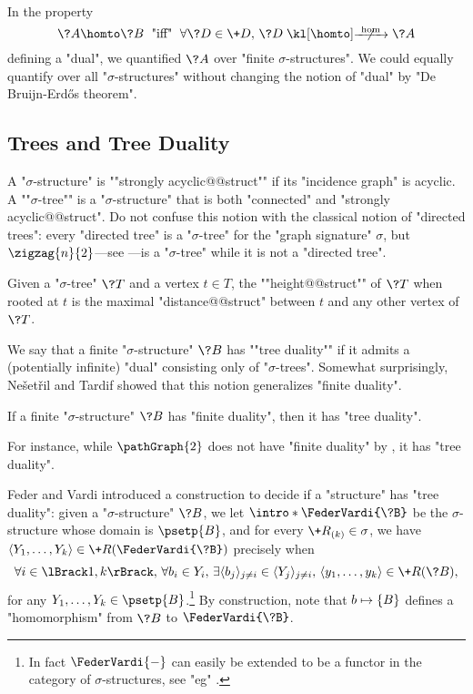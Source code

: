 \begin{remark}
	In the property
	\[
		\?A \homto \?B
		\;\text{ "iff" }\;
		\forall \?D \in \+D,\, \?D \nothomto \?A
	\]
	defining a "dual", we quantified $\?A$ over "finite $\sigma$-structures". 
	We could equally quantify over all "$\sigma$-structures" without changing the notion of "dual" by "De Bruijn-Erdős theorem".
\end{remark}


\subsection{Trees and Tree Duality}

A "$\sigma$-structure" is \AP""strongly acyclic@@struct"" if its "incidence graph" is acyclic.
A \AP""$\sigma$-tree"" is a "$\sigma$-structure" that is both "connected" and "strongly acyclic@@struct".
Do not confuse this notion with the classical notion of "directed trees":
every "directed tree" is a "$\sigma$-tree" for the "graph signature" $\sigma$,
but $\zigzag{n}{2}$---see ---is a "$\sigma$-tree"
while it is not a "directed tree". 

Given a "$\sigma$-tree" $\?T$ and a vertex $t\in T$, the \AP""height@@struct"" of $\?T$
when rooted at $t$ is the maximal "distance@@struct" between $t$ and any other vertex of $\?T$.

We say that a finite "$\sigma$-structure" $\?B$ has \AP""tree duality""
if it admits a (potentially infinite) "dual" consisting only of "$\sigma$-trees".
Somewhat surprisingly, Ne\v{s}et\v{r}il and Tardif showed that
this notion generalizes "finite duality".

\begin{proposition}
	\AP\label{prop:finite-duality-implies-tree-duality}
	If a finite "$\sigma$-structure" $\?B$ has "finite duality",
	then it has "tree duality".
\end{proposition}

For instance, while $\pathGraph{2}$ does not have "finite duality" by ,
it has "tree duality".

Feder and Vardi introduced a construction to decide if a "structure" has "tree duality":
given a "$\sigma$-structure" $\?B$, we let \AP$\intro*\FederVardi{\?B}$ be
the $\sigma$-structure whose domain is $\psetp{B}$, and for every $\+R_{(k)} \in \sigma$,
we have $\tup{Y_1, \hdots, Y_k} \in \+R(\FederVardi{\?B})$ precisely when 
\[
	\forall i \in \lBrack 1,k\rBrack,\,
	\forall b_i \in Y_i,\,
	\exists \tup{b_j}_{j \neq i} \in \tup{Y_j}_{j \neq i},\,
	\tup{y_1, \hdots, y_k} \in \+R(\?B),
\]
for any $Y_1, \hdots, Y_k \in \psetp{B}$.\footnote{In fact $\FederVardi{-}$ can
easily be extended to be a functor in the category of $\sigma$-structures, see
"eg" \cite[\S~9.2.2]{NesetrilPOM2012FirstOrderCSPs}.}
By construction, note that $b \mapsto \{B\}$ defines a "homomorphism" from
$\?B$ to $\FederVardi{\?B}$.

